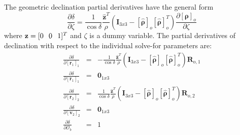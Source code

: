 The geometric declination partial derivatives have the general form
%
\begin{equation}
    \frac{\partial \delta}{\partial \zeta} = \frac{1}{\cos{\delta}}\frac{\hat{\mathbf{z}}^T}{\rho}
    \left(\mathbf{I}_{3x3} - \left[\hat{ \boldsymbol{\rho} }\right]_o
    \left[\hat{ \boldsymbol{\rho} }\right]_o^T  \right)\frac{\partial \left[\boldsymbol{\rho}\right]_o }{\partial \zeta}
\end{equation}
%
where $\mathbf{z} = [0 \hspace{.1 in} 0 \hspace{0.1 in} 1]^T$ and
$\zeta$ is a dummy variable.  The partial derivatives of declination
with respect to the individual solve-for parameters are:
%
\begin{eqnarray}
    \frac{\partial \delta}{\partial \left[ \mathbf{r}_1 \right]_{1}} & = &
     -\frac{1}{\cos{\delta}}\frac{\hat{\mathbf{z}}^T}{\rho}
    \left(\mathbf{I}_{3x3} - \left[\hat{ \boldsymbol{\rho} }\right]_o
    \left[\hat{ \boldsymbol{\rho} }\right]_o^T  \right)\mathbf{R}_{o,1} \\
    \frac{\partial \delta}{\partial \left[ \dot{\mathbf{r}}_1 \right]_{1}} & = & \mathbf{0}_{1x3} \\
    \frac{\partial \delta}{\partial \left[ \mathbf{r}_2 \right]_{2}} & = &
    \frac{1}{\cos{\delta}}\frac{\hat{\mathbf{z}}^T}{\rho}
    \left(\mathbf{I}_{3x3} - \left[\hat{ \boldsymbol{\rho} }\right]_o
    \left[\hat{ \boldsymbol{\rho} }\right]_o^T  \right)\mathbf{R}_{o,2}\\
    \frac{\partial \delta}{\partial \left[ \mathbf{v}_2 \right]_{2}} & = & \mathbf{0}_{1x3}\\
    \frac{\partial \delta}{\partial  \mathcal{O}_b } & = & 1
\end{eqnarray}

